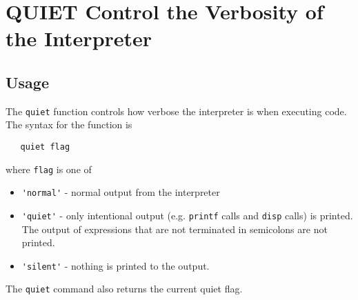 \section{QUIET Control the Verbosity of the Interpreter}

\subsection{Usage}

The \verb|quiet| function controls how verbose the interpreter
is when executing code.  The syntax for the function is
\begin{verbatim}
   quiet flag
\end{verbatim}
where \verb|flag| is one of
\begin{itemize}
\item  \verb|'normal'| - normal output from the interpreter

\item  \verb|'quiet'| - only intentional output (e.g. \verb|printf| calls and
\verb|disp| calls) is printed.  The output of expressions that are not
terminated in semicolons are not printed.

\item  \verb|'silent'| - nothing is printed to the output.

\end{itemize}
The \verb|quiet| command also returns the current quiet flag.
